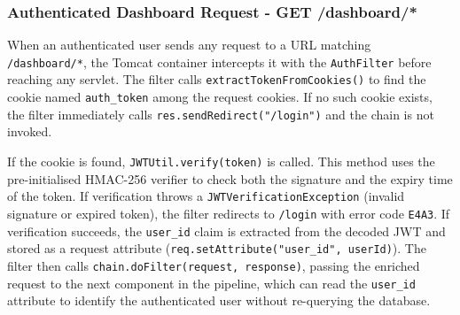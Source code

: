 \subsubsection*{Authenticated Dashboard Request - GET /dashboard/*}

When an authenticated user sends any request to a URL matching \texttt{/dashboard/*}, the Tomcat container intercepts it with the \texttt{AuthFilter} before reaching any servlet. The filter calls \texttt{extractTokenFromCookies()} to find the cookie named \texttt{auth\_token} among the request cookies. If no such cookie exists, the filter immediately calls \texttt{res.sendRedirect("/login")} and the chain is not invoked.

If the cookie is found, \texttt{JWTUtil.verify(token)} is called. This method uses the pre-initialised HMAC-256 verifier to check both the signature and the expiry time of the token. If verification throws a \texttt{JWTVerificationException} (invalid signature or expired token), the filter redirects to \texttt{/login} with error code \texttt{E4A3}. If verification succeeds, the \texttt{user\_id} claim is extracted from the decoded JWT and stored as a request attribute (\texttt{req.setAttribute("user\_id", userId)}). The filter then calls \texttt{chain.doFilter(request, response)}, passing the enriched request to the next component in the pipeline, which can read the \texttt{user\_id} attribute to identify the authenticated user without re-querying the database.